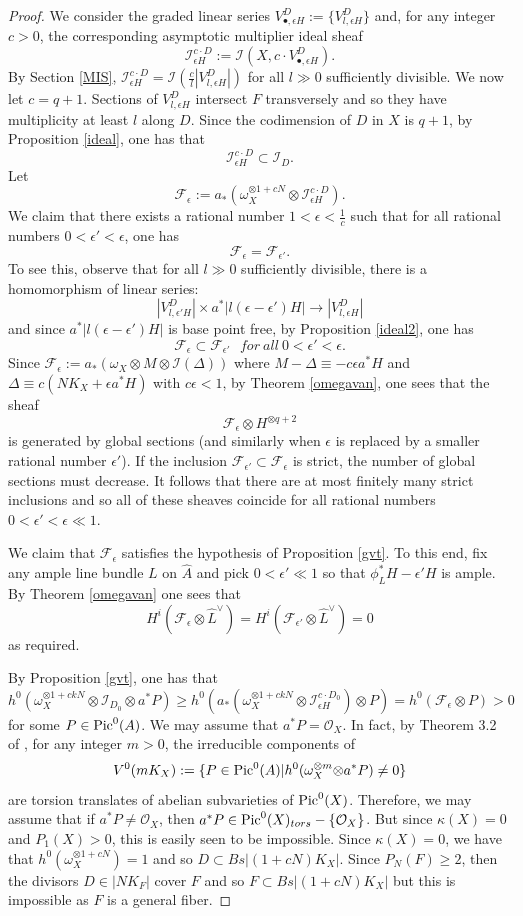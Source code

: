 \documentclass[10pt, a4paper]{amsart}
\newcommand\Pic{{\text{\rm Pic}}}
\newcommand\lra{\longrightarrow}
\newcommand\ot{{\otimes}}
\newcommand\OO{{\mathcal{O}}}
\newcommand\FF{{\mathcal{F}}}
\newcommand\II{{\mathcal{I}}}
\begin{document}
\begin{proof}
We consider the graded linear series
$V^{D}_{\bullet, \epsilon H}:=\{ V^{D}_{l,\epsilon H} \}$
and, for any integer $c>0$, the corresponding asymptotic multiplier ideal sheaf
$$\II ^{c\cdot D}_{\epsilon H}:=\II (X,c\cdot V^{D}_{\bullet, \epsilon H})
.$$
By Section \ref{MIS}, $\II ^{c\cdot {D}}_{\epsilon H}=
\II (\frac{c}{l}|V^{D}_{l,\epsilon H}|) $
for all $l\gg 0$ sufficiently divisible.
We now let $c=q+1$. Sections of $V^{D}_{l,\epsilon H}$ intersect $F$ transversely
and so they have multiplicity at least
$l$ along $D$. Since the codimension of $D$ in $X$ is $q+1$,
by Proposition \ref{ideal},
one has that $$\II ^{c\cdot {D}}_{\epsilon H}\subset \II _{D}.$$
Let $$\FF _\epsilon :=a_*(\omega _X ^{\ot 1+cN}\ot 
\II ^{c\cdot {D}}_{\epsilon H}).$$
We claim that there exists a rational number $1<\epsilon <\frac {1}{c}$
such that for all rational numbers $0<\epsilon '<\epsilon$, one has
$$\FF _\epsilon =\FF _{\epsilon '}.$$
To see this, observe that for all $l\gg 0$ sufficiently divisible, 
there is a homomorphism of
linear series:
$$|V^{{D}}_{l,\epsilon ' H}|\times a^*|l(\epsilon -\epsilon ')H|\lra
|V^{D}_{l,\epsilon  H}|$$
and since $a^*|l(\epsilon -\epsilon ')H|$ is base point free, 
by Proposition \ref{ideal2}, one has
$$\FF _\epsilon\subset\FF _{\epsilon '}
\ \ \ for\ all\ 0<\epsilon '<\epsilon .$$ 
Since $\FF _\epsilon:= a_*(\omega _X \ot M \ot \II (\Delta ))$
where $M-\Delta\equiv{ -c\epsilon }a^*H$ 
and $\Delta\equiv c(NK_X+\epsilon a^*H)$ with 
$c\epsilon<1$, 
by Theorem \ref{omegavan}, 
one sees that  the sheaf 
$$\FF _\epsilon\ot
H^{\ot q+2}$$ 
is generated by global sections (and similarly when $\epsilon$ is replaced by
a smaller rational number $\epsilon '$).
If the inclusion $\FF _{\epsilon '}\subset \FF _\epsilon$
is strict, the number of global sections must 
decrease. It follows that there are at most finitely many 
strict inclusions and so all of these sheaves coincide for all
rational numbers $0<\epsilon '< \epsilon \ll 1$.

We claim that $\FF _{\epsilon}$ satisfies the hypothesis of
Proposition \ref{gvt}. To this end, fix any ample line bundle $L$ on
$\hat{A}$ and pick $0<\epsilon ' \ll 1$ so that $\phi _L^*H-\epsilon ' H$
is ample. By Theorem \ref{omegavan} one sees that $$H^i(\FF _{\epsilon }\ot
\hat {L}^\vee)= H^i(\FF _{\epsilon '}\ot
\hat {L}^\vee)=0$$
as required.

By Proposition \ref{gvt}, one has that 
$$h^0(\omega _X^{\ot 1+ckN}\ot \II _{D_0}\ot a^*P)\geq
h^0(a_*(\omega _X^{\ot 1+ckN}\ot \II ^{c\cdot D_0}_{\epsilon H})\ot P)
=h^0(\FF _\epsilon \ot P)>0$$
for some $P\in \Pic ^0(A)$. We may assume that $a^*P=\OO _X$.
In fact, by Theorem 3.2 of \cite{CH2}, for any integer $m>0$,
the irreducible components of
$$V^0(mK_X):=\{ P\in \Pic ^0(A) | h^0(\omega ^{\ot m}_X \ot a^* P)\ne 0 \}$$
are torsion translates of abelian subvarieties of $\Pic ^0(X)$.
Therefore, we may 
assume that if $a^*P\ne \OO _X$, then
$a^*P\in \Pic ^0(X)_{tors}-\{\OO _X \}$. But since $\kappa (X)=0$ and $P_1(X)>0$,
this is easily seen to be impossible.
Since $\kappa (X)=0$, we have that $h^0(\omega _X^{\ot 1+cN})=1$ 
and so $D\subset Bs |(1+cN)K_X|$. 
Since $P_N(F)\geq 2$, then the divisors $D\in |NK_F|$ cover
$F$ and so $F\subset Bs|(1+cN)K_X|$ but this is impossible as $F$ is a general
fiber.


\end{proof}
\end{document}
